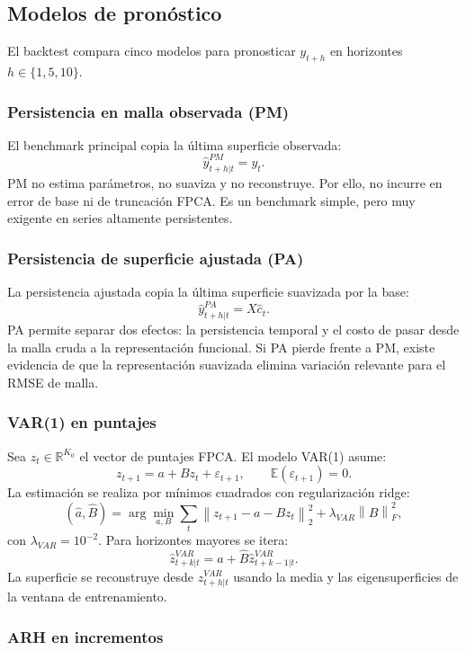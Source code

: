 \documentclass[a4paper,11pt]{article}
\newcommand{\R}{\mathbb{R}}
\newcommand{\E}{\mathbb{E}}
\newcommand{\norm}[1]{\left\lVert #1 \right\rVert}
\begin{document}
\subsection{Modelos de pronóstico}

El backtest compara cinco modelos para pronosticar \(y_{t+h}\) en horizontes \(h\in\{1,5,10\}\).

\subsubsection{Persistencia en malla observada (PM)}

El benchmark principal copia la última superficie observada:
\[
  \widehat y_{t+h|t}^{PM}=y_t.
\]
PM no estima parámetros, no suaviza y no reconstruye. Por ello, no incurre en error de base ni de truncación FPCA. Es un benchmark simple, pero muy exigente en series altamente persistentes.

\subsubsection{Persistencia de superficie ajustada (PA)}

La persistencia ajustada copia la última superficie suavizada por la base:
\[
  \widehat y_{t+h|t}^{PA}=X\widehat c_t.
\]
PA permite separar dos efectos: la persistencia temporal y el costo de pasar desde la malla cruda a la representación funcional. Si PA pierde frente a PM, existe evidencia de que la representación suavizada elimina variación relevante para el RMSE de malla.

\subsubsection{VAR(1) en puntajes}

Sea \(z_t\in\R^{K_0}\) el vector de puntajes FPCA. El modelo VAR(1) asume:
\[
  z_{t+1}=a+Bz_t+\varepsilon_{t+1},
  \qquad
  \E(\varepsilon_{t+1})=0.
\]
La estimación se realiza por mínimos cuadrados con regularización ridge:
\[
  (\widehat a,\widehat B)
  =
  \arg\min_{a,B}
  \sum_t \norm{z_{t+1}-a-Bz_t}_2^2
  +\lambda_{VAR}\norm{B}_F^2,
\]
con \(\lambda_{VAR}=10^{-2}\). Para horizontes mayores se itera:
\[
  \widehat z_{t+k|t}^{VAR}
  =
  \widehat a+\widehat B\widehat z_{t+k-1|t}^{VAR}.
\]
La superficie se reconstruye desde \(\widehat z_{t+h|t}^{VAR}\) usando la media y las eigensuperficies de la ventana de entrenamiento.

\subsubsection{ARH en incrementos}
\end{document}

